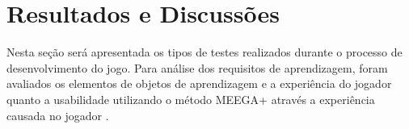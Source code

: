 \documentclass[10pt, conference, compsocconf]{IEEEtran}
\begin{document}

	
	


\section{Resultados e Discussões} \label{resultado}

Nesta seção será apresentada os tipos de testes realizados durante o processo de desenvolvimento do jogo. Para análise dos requisitos de aprendizagem, foram avaliados os elementos de objetos de aprendizagem \cite{alves2015gamification} e a experiência do jogador quanto a usabilidade utilizando o método MEEGA+ através a experiência causada no jogador \cite{von2018meega+}.
\end{document}
